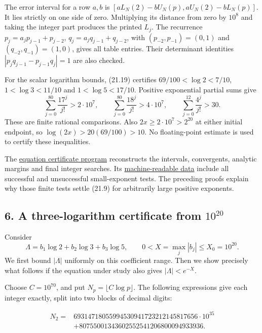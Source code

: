 \documentclass[
  11pt,
  a4paper,
]{article}
\begin{document}
The error interval for a row \(a,b\) is
\([aL_N(2)-bU_N(p),aU_N(2)-bL_N(p)]\). It lies strictly on one side of
zero. Multiplying its distance from zero by \(10^8\) and taking the
integer part produces the printed \(L_j\). The recurrence
\(p_j=a_jp_{j-1}+p_{j-2}\), \(q_j=a_jq_{j-1}+q_{j-2}\), with
\((p_{-2},p_{-1})=(0,1)\) and \((q_{-2},q_{-1})=(1,0)\), gives all table
entries. Their determinant identities \(|p_jq_{j-1}-p_{j-1}q_j|=1\) are
also checked.

For the scalar logarithm bounds, (21.19) certifies
\(69/100<\log2<7/10\), \(1<\log3<11/10\) and \(1<\log5<17/10\). Positive
exponential partial sums give \[
 \sum_{j=0}^{80}\frac{17^j}{j!}>2\cdot10^7,\qquad
 \sum_{j=0}^{80}\frac{18^j}{j!}>4\cdot10^7,\qquad
 \sum_{j=0}^{12}\frac{4^j}{j!}>30.
\] These are finite rational comparisons. Also
\(2x\ge2\cdot10^7>2^{20}\) at either initial endpoint, so
\(\log(2x)>20(69/100)>10\). No floating-point estimate is used to
certify these inequalities.

The \href{https://kokunoyumeto.github.io/open-math-courses-public/courses/TR-BAKER/verification/equation-certificates.py}{equation certificate
program} reconstructs the intervals, convergents, analytic margins and
final integer searches. Its
\href{https://kokunoyumeto.github.io/open-math-courses-public/courses/TR-BAKER/verification/equation-certificates.json}{machine-readable data}
include all successful and unsuccessful small-exponent tests. The
preceding proofs explain why those finite tests settle (21.9) for
arbitrarily large positive exponents.

\subsection{\texorpdfstring{6. A three-logarithm certificate from
\(10^{20}\)}{6. A three-logarithm certificate from 10\^{}\{20\}}}\label{a-three-logarithm-certificate-from-1020}

Consider \[
 \Lambda=b_1\log2+b_2\log3+b_3\log5,\qquad
 0<X=\max_j|b_j|\le X_0=10^{20}.
 \tag{21.20}
\] We first bound \(|\Lambda|\) uniformly on this coefficient range.
Then we show precisely what follows if the equation under study also
gives \(|\Lambda|<e^{-X}\).

Choose \(C=10^{70}\), and put \(N_p=\lfloor C\log p\rfloor\). The
following expressions give each integer exactly, split into two blocks
of decimal digits:

\[
\begin{aligned}
N_2={}&69314718055994530941723212145817656\cdot10^{35}\\
&+80755001343602552541206800094933936.
\end{aligned}
\]
\end{document}
